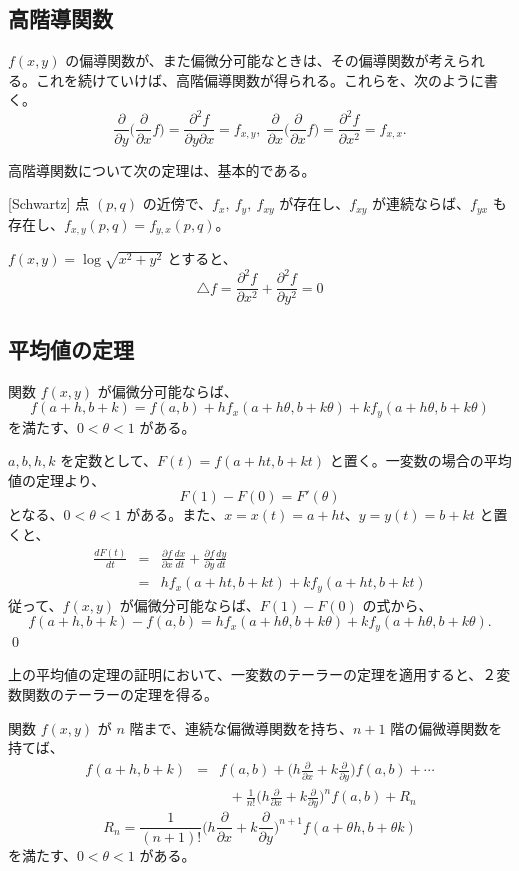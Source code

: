 \subsection{高階導関数}
$f(x,y)$ の偏導関数が、また偏微分可能なときは、その偏導関数が考えられる。これを続けていけば、高階偏導関数が得られる。これらを、次のように書く。
$$\frac{\partial}{\partial y}\bigl(\frac{\partial}{\partial x}f\bigr) = \frac{\partial^2f}{\partial y\partial x} = f_{x,y},\; \frac{\partial}{\partial x}\bigl(\frac{\partial}{\partial x}f\bigr) = \frac{\partial^2f}{\partial x^2} = f_{x,x}.$$

\medskip
高階導関数について次の定理は、基本的である。
\begin{thm}{\rm [Schwartz]} \label{thm:higherder}
点 $(p,q)$ の近傍で、$f_x, \:f_y, \:f_{xy}$ が存在し、$f_{xy}$ が連続ならば、$f_{yx}$ も存在し、$f_{x,y}(p,q) = f_{y,x}(p,q)$。
\end{thm}

\begin{eg}
$f(x,y) = \log\sqrt{x^2+y^2}$ とすると、
$$\triangle f = \frac{\partial^2f}{\partial x^2} + \frac{\partial^2 f}{\partial y^2} = 0$$
\end{eg}

\subsection{平均値の定理}
\begin{prop}
関数 $f(x,y)$ が偏微分可能ならば、
$$f(a+h,b+k) = f(a,b) + hf_x(a+h\theta,b+k\theta) + kf_y(a+h\theta,b+k\theta)$$
を満たす、$0<\theta<1$ がある。
\end{prop}
\proof
$a, b, h, k$ を定数として、$F(t) = f(a+ht, b+kt)$ と置く。一変数の場合の平均値の定理より、
$$F(1) - F(0) = F'(\theta)$$
となる、$0 < \theta < 1$ がある。また、$x = x(t) = a+ht$、$y = y(t) = b+kt$ と置くと、
\begin{eqnarray*}
\frac{dF(t)}{dt} & = & \frac{\partial f}{\partial x}\frac{dx}{dt} + \frac{\partial f}{\partial y}\frac{dy}{dt}\\
& = & hf_x(a+ht,b+kt) + kf_y(a+ht,b+kt)
\end{eqnarray*}
従って、$f(x,y)$ が偏微分可能ならば、$F(1) - F(0)$ の式から、
$$f(a+h,b+k) - f(a,b) = hf_x(a+h\theta,b+k\theta) + kf_y(a+h\theta,b+k\theta).$$
\qed

\medskip
上の平均値の定理の証明において、一変数のテーラーの定理を適用すると、２変数関数のテーラーの定理を得る。
\begin{prop} \label{prop:taylor-mv}
関数 $f(x,y)$ が $n$ 階まで、連続な偏微導関数を持ち、$n+1$ 階の偏微導関数を持てば、
\begin{eqnarray*}
f(a+h,b+k) &= &f(a,b) + \bigl(h\frac{\partial}{\partial x} + k\frac{\partial}{\partial y}\bigr)f(a,b) + \cdots\\
& & \mbox{ }+\frac{1}{n!}\bigl(h\frac{\partial}{\partial x} + k\frac{\partial}{\partial y}\bigr)^nf(a,b) + R_n
\end{eqnarray*}
$$R_n = \frac{1}{(n+1)!}\bigl(h\frac{\partial}{\partial x} + k\frac{\partial}{\partial y}\bigr)^{n+1}f(a+\theta h,b+\theta k)$$
を満たす、$0<\theta<1$ がある。
\end{prop}

